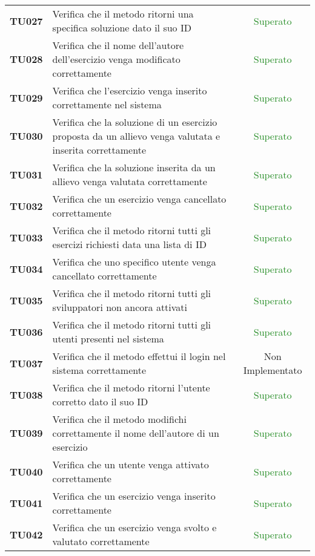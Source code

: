 \begin{tabularx}{\textwidth}{cXc}
	\textbf{TU027} & Verifica che il metodo ritorni una specifica soluzione dato il suo ID & \textcolor{ForestGreen}{Superato} \\
	\textbf{TU028} & Verifica che il nome dell'autore dell'esercizio venga modificato correttamente & \textcolor{ForestGreen}{Superato} \\
	\textbf{TU029} & Verifica che l'esercizio venga inserito correttamente nel sistema & \textcolor{ForestGreen}{Superato} \\
	\textbf{TU030} & Verifica che la soluzione di un esercizio proposta da un allievo venga valutata e inserita correttamente & \textcolor{ForestGreen}{Superato} \\
	\textbf{TU031} & Verifica che la soluzione inserita da un allievo venga valutata correttamente & \textcolor{ForestGreen}{Superato} \\
	\textbf{TU032} & Verifica che un esercizio venga cancellato correttamente & \textcolor{ForestGreen}{Superato} \\
	\textbf{TU033} & Verifica che il metodo ritorni tutti gli esercizi richiesti data una lista di ID & \textcolor{ForestGreen}{Superato} \\
	\textbf{TU034} & Verifica che uno specifico utente venga cancellato correttamente & \textcolor{ForestGreen}{Superato} \\
	\textbf{TU035} & Verifica che il metodo ritorni tutti gli sviluppatori non ancora attivati & \textcolor{ForestGreen}{Superato} \\
	\textbf{TU036} & Verifica che il metodo ritorni tutti gli utenti presenti nel sistema & \textcolor{ForestGreen}{Superato} \\
	\textbf{TU037} & Verifica che il metodo effettui il login nel sistema correttamente & Non Implementato \\
	\textbf{TU038} & Verifica che il metodo ritorni l'utente corretto dato il suo ID & \textcolor{ForestGreen}{Superato} \\
	\textbf{TU039} & Verifica che il metodo modifichi correttamente il nome dell'autore di un esercizio & \textcolor{ForestGreen}{Superato} \\
	\textbf{TU040} & Verifica che un utente venga attivato correttamente & \textcolor{ForestGreen}{Superato} \\
	\textbf{TU041} & Verifica che un esercizio venga inserito correttamente & \textcolor{ForestGreen}{Superato} \\
	\textbf{TU042} & Verifica che un esercizio venga svolto e valutato correttamente & \textcolor{ForestGreen}{Superato} \\

\end{tabularx}
